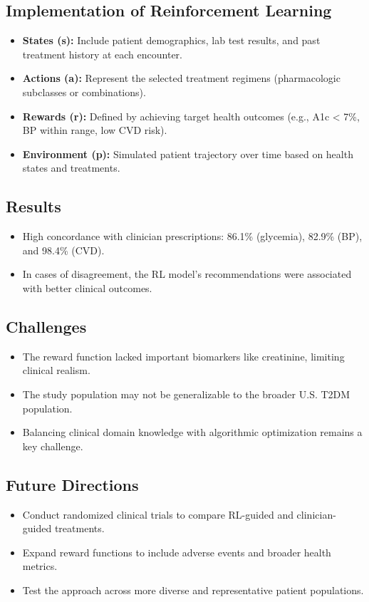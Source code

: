 \subsection*{Implementation of Reinforcement Learning}
\begin{itemize}
    \item \textbf{States (s):} Include patient demographics, lab test results, and past treatment history at each encounter.
    \item \textbf{Actions (a):} Represent the selected treatment regimens (pharmacologic subclasses or combinations).
    \item \textbf{Rewards (r):} Defined by achieving target health outcomes (e.g., A1c < 7\%, BP within range, low CVD risk).
    \item \textbf{Environment (p):} Simulated patient trajectory over time based on health states and treatments.
\end{itemize}

\subsection*{Results}
\begin{itemize}
    \item High concordance with clinician prescriptions: 86.1\% (glycemia), 82.9\% (BP), and 98.4\% (CVD).
    \item In cases of disagreement, the RL model's recommendations were associated with better clinical outcomes.
\end{itemize}

\subsection*{Challenges}
\begin{itemize}
    \item The reward function lacked important biomarkers like creatinine, limiting clinical realism.
    \item The study population may not be generalizable to the broader U.S. T2DM population.
    \item Balancing clinical domain knowledge with algorithmic optimization remains a key challenge.
\end{itemize}

\subsection*{Future Directions}
\begin{itemize}
    \item Conduct randomized clinical trials to compare RL-guided and clinician-guided treatments.
    \item Expand reward functions to include adverse events and broader health metrics.
    \item Test the approach across more diverse and representative patient populations.
\end{itemize}

